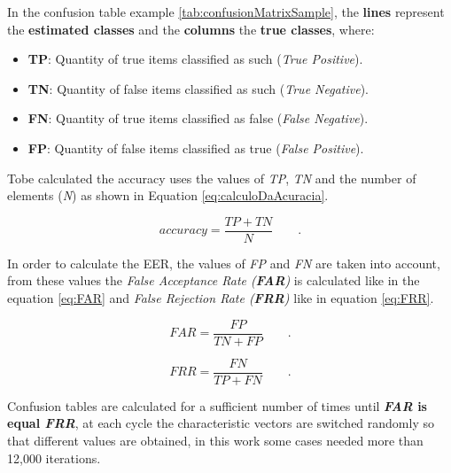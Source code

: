 		\par In the confusion table example  \ref{tab:confusionMatrixSample}, the \textbf{lines} represent the \textbf{estimated classes} and the \textbf{columns} the \textbf{true classes}, where:

		\begin{itemize}
			\item \textbf{TP}: Quantity of true items classified as such (\textit{True Positive}).
			\item \textbf{TN}: Quantity of false items classified as such (\textit{True Negative}).
			\item \textbf{FN}: Quantity of true items classified as false (\textit{False Negative}).
			\item \textbf{FP}: Quantity of false items classified as true (\textit{False Positive}).
		\end{itemize}

		
		
		\par Tobe calculated the accuracy uses the values of \textit{TP}, \textit{TN} and the number of elements (\textit{N}) as shown in Equation \ref{eq:calculoDaAcuracia}.
		
		\begin{equation}
			accuracy = \dfrac{TP + TN}{N} \qquad.
			\label{eq:calculoDaAcuracia}
		\end{equation}

		\par In order to calculate the EER, the values of \textit{FP} and \textit{FN} \cite{ghazali2018recent} are taken into account, from these values the \textit{False Acceptance Rate (\textbf{FAR})} is calculated like in the equation \ref{eq:FAR} and \textit{False Rejection Rate (\textbf{FRR})} like in equation \ref{eq:FRR}.

		\begin{equation}
			FAR=\dfrac{FP}{TN+FP} \qquad.
			\label{eq:FAR}
		\end{equation}
		
		\begin{equation}
			FRR=\dfrac{FN}{TP+FN} \qquad.
			\label{eq:FRR}
		\end{equation}

		\par Confusion tables are calculated for a sufficient number of times until \textbf{\textit{FAR} is equal \textit{FRR}}, at each cycle the characteristic vectors are switched randomly so that different values are obtained, in this work some cases needed more than 12,000 iterations.

